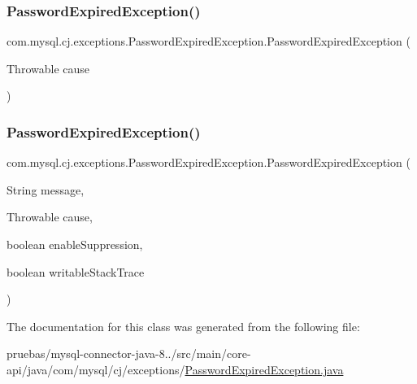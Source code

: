 \subsubsection{\texorpdfstring{Password\+Expired\+Exception()}{PasswordExpiredException()}\hspace{0.1cm}{\footnotesize\ttfamily [4/5]}}
{\footnotesize\ttfamily com.\+mysql.\+cj.\+exceptions.\+Password\+Expired\+Exception.\+Password\+Expired\+Exception (\begin{DoxyParamCaption}\item[{Throwable}]{cause }\end{DoxyParamCaption})}

\mbox{\label{classcom_1_1mysql_1_1cj_1_1exceptions_1_1_password_expired_exception_a2b380747747565c5cf7f6be986ca0b0a}} 
\subsubsection{\texorpdfstring{Password\+Expired\+Exception()}{PasswordExpiredException()}\hspace{0.1cm}{\footnotesize\ttfamily [5/5]}}
{\footnotesize\ttfamily com.\+mysql.\+cj.\+exceptions.\+Password\+Expired\+Exception.\+Password\+Expired\+Exception (\begin{DoxyParamCaption}\item[{String}]{message,  }\item[{Throwable}]{cause,  }\item[{boolean}]{enable\+Suppression,  }\item[{boolean}]{writable\+Stack\+Trace }\end{DoxyParamCaption})\hspace{0.3cm}{\ttfamily [protected]}}



The documentation for this class was generated from the following file\+:\begin{DoxyCompactItemize}
\item 
pruebas/mysql-\/connector-\/java-\/8../src/main/core-\/api/java/com/mysql/cj/exceptions/\mbox{\hyperlink{_password_expired_exception_8java}{Password\+Expired\+Exception.\+java}}\end{DoxyCompactItemize}

